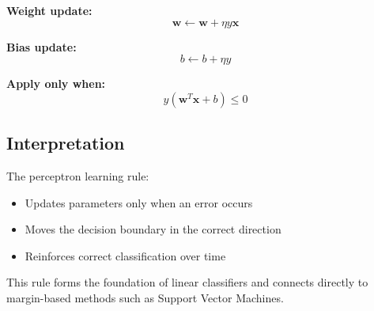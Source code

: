 \documentclass[12pt,a4paper]{article}
\begin{document}
\textbf{Weight update:}
\[
\mathbf{w} \leftarrow \mathbf{w} + \eta y \mathbf{x}
\]

\textbf{Bias update:}
\[
b \leftarrow b + \eta y
\]

\textbf{Apply only when:}
\[
y(\mathbf{w}^T \mathbf{x} + b) \leq 0
\]

\subsection{Interpretation}

The perceptron learning rule:
\begin{itemize}
    \item Updates parameters only when an error occurs
    \item Moves the decision boundary in the correct direction
    \item Reinforces correct classification over time
\end{itemize}

This rule forms the foundation of linear classifiers and connects directly to margin-based methods such as Support Vector Machines.
\end{document}
